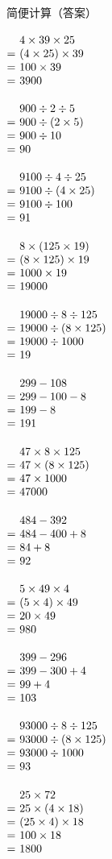 \documentclass[UTF8]{ctexart}
\makeatletter
\newcommand{\sheettitle}[1]{%
  \noindent\begin{minipage}[t][18mm][t]{\textwidth}%
    \vspace{0pt}\centering\zihao{2}#1\par
  \end{minipage}\par\nointerlineskip
}
\newcommand{\cell}[2]{%
  \begin{minipage}[t][35mm][t]{0.315\textwidth}%
    \vspace{0pt}\linespread{1}#1\selectfont
    \strut#2%
  \end{minipage}%
}
\newcommand{\arow}[3]{%
  \noindent\cell{\zihao{-4}}{#1}\hfill
  \cell{\zihao{-4}}{#2}\hfill
  \cell{\zihao{-4}}{#3}\par\nointerlineskip
}
\newcommand{\eqgap}{0.35em}
\newcommand{\problemline}[1]{#1}
\newcommand{\solution}[1]{%
  \(\begin{array}[t]{@{}r@{\hspace{\eqgap}}l@{}}#1\end{array}\)%
}
\makeatother
\begin{document}
\sheettitle{简便计算（答案）}
\arow
{\solution{
& \problemline{4\times 39\times 25} \\
= & (4\times 25)\times 39 \\
= & 100\times 39 \\
= & 3900
}}
{\solution{
& \problemline{900\div 2\div 5} \\
= & 900\div (2\times 5) \\
= & 900\div 10 \\
= & 90
}}
{\solution{
& \problemline{9100\div 4\div 25} \\
= & 9100\div (4\times 25) \\
= & 9100\div 100 \\
= & 91
}}
\arow
{\solution{
& \problemline{8\times (125\times 19)} \\
= & (8\times 125)\times 19 \\
= & 1000\times 19 \\
= & 19000
}}
{\solution{
& \problemline{19000\div 8\div 125} \\
= & 19000\div (8\times 125) \\
= & 19000\div 1000 \\
= & 19
}}
{\solution{
& \problemline{299-108} \\
= & 299-100-8 \\
= & 199-8 \\
= & 191
}}
\arow
{\solution{
& \problemline{47\times 8\times 125} \\
= & 47\times (8\times 125) \\
= & 47\times 1000 \\
= & 47000
}}
{\solution{
& \problemline{484-392} \\
= & 484-400+8 \\
= & 84+8 \\
= & 92
}}
{\solution{
& \problemline{5\times 49\times 4} \\
= & (5\times 4)\times 49 \\
= & 20\times 49 \\
= & 980
}}
\arow
{\solution{
& \problemline{399-296} \\
= & 399-300+4 \\
= & 99+4 \\
= & 103
}}
{\solution{
& \problemline{93000\div 8\div 125} \\
= & 93000\div (8\times 125) \\
= & 93000\div 1000 \\
= & 93
}}
{\solution{
& \problemline{25\times 72} \\
= & 25\times (4\times 18) \\
= & (25\times 4)\times 18 \\
= & 100\times 18 \\
= & 1800
}}
\end{document}
